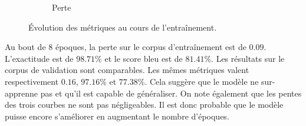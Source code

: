 \begin{figure}[hbt]
\begin{subfigure}{.5\textwidth}
\begin{center}
        \end{center}
        \caption{Perte}
        \label{fig.results.training.loss}
    \end{subfigure}
    \caption{Évolution des métriques au cours de l'entraînement.}
    \label{fig.results.training}
\end{figure}
Au bout de 8 époques, la perte sur le corpus d'entraînement est de \(0.09\).
L'exactitude est de \(98.71\%\) et le score \gls{bleu} est de \(81.41\%\).
Les résultats sur le corpus de validation sont comparables.
Les mêmes métriques valent respectivement \(0.16\), \(97.16\%\) et \(77.38\%\).
Cela suggère que le modèle ne sur-apprenne pas et qu'il est capable de généraliser.
On note également que les pentes des trois courbes ne sont pas négligeables.
Il est donc probable que le modèle puisse encore s'améliorer en augmentant le nombre d'époques.